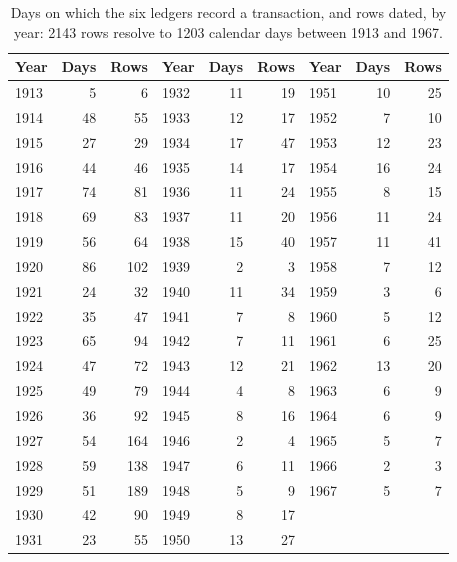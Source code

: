 \begin{table}[htbp]\centering\footnotesize
\caption{Days on which the six ledgers record a transaction, and rows dated, by year: 2143 rows resolve to 1203 calendar days between 1913 and 1967.}\label{tab:streak}
\begin{tabular}{lrr@{\hspace{2em}}lrr@{\hspace{2em}}lrr}\toprule Year & Days & Rows & Year & Days & Rows & Year & Days & Rows\\\midrule
1913 & 5 & 6 & 1932 & 11 & 19 & 1951 & 10 & 25\\
1914 & 48 & 55 & 1933 & 12 & 17 & 1952 & 7 & 10\\
1915 & 27 & 29 & 1934 & 17 & 47 & 1953 & 12 & 23\\
1916 & 44 & 46 & 1935 & 14 & 17 & 1954 & 16 & 24\\
1917 & 74 & 81 & 1936 & 11 & 24 & 1955 & 8 & 15\\
1918 & 69 & 83 & 1937 & 11 & 20 & 1956 & 11 & 24\\
1919 & 56 & 64 & 1938 & 15 & 40 & 1957 & 11 & 41\\
1920 & 86 & 102 & 1939 & 2 & 3 & 1958 & 7 & 12\\
1921 & 24 & 32 & 1940 & 11 & 34 & 1959 & 3 & 6\\
1922 & 35 & 47 & 1941 & 7 & 8 & 1960 & 5 & 12\\
1923 & 65 & 94 & 1942 & 7 & 11 & 1961 & 6 & 25\\
1924 & 47 & 72 & 1943 & 12 & 21 & 1962 & 13 & 20\\
1925 & 49 & 79 & 1944 & 4 & 8 & 1963 & 6 & 9\\
1926 & 36 & 92 & 1945 & 8 & 16 & 1964 & 6 & 9\\
1927 & 54 & 164 & 1946 & 2 & 4 & 1965 & 5 & 7\\
1928 & 59 & 138 & 1947 & 6 & 11 & 1966 & 2 & 3\\
1929 & 51 & 189 & 1948 & 5 & 9 & 1967 & 5 & 7\\
1930 & 42 & 90 & 1949 & 8 & 17 &  & & \\
1931 & 23 & 55 & 1950 & 13 & 27 &  & & \\
\bottomrule\end{tabular}\end{table}


